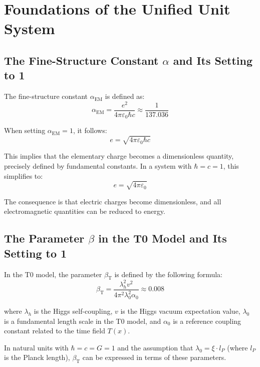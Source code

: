 \documentclass[12pt,a4paper]{article}
\newcommand{\Tfield}{T(x)}
\newcommand{\alphaEM}{\alpha_{\text{EM}}}
\newcommand{\betaT}{\beta_{\text{T}}}
\begin{document}
	\section{Foundations of the Unified Unit System}
	
	\subsection{The Fine-Structure Constant \(\alpha\) and Its Setting to 1}
	
	The fine-structure constant \(\alphaEM\) is defined as:
	\begin{equation}
		\alphaEM = \frac{e^2}{4\pi\varepsilon_0 \hbar c} \approx \frac{1}{137.036}
	\end{equation}
	
	When setting \(\alphaEM = 1\), it follows:
	\begin{equation}
		e = \sqrt{4\pi\varepsilon_0 \hbar c}
	\end{equation}
	
	This implies that the elementary charge becomes a dimensionless quantity, precisely defined by fundamental constants. In a system with \(\hbar = c = 1\), this simplifies to:
	\begin{equation}
		e = \sqrt{4\pi\varepsilon_0}
	\end{equation}
	
	The consequence is that electric charges become dimensionless, and all electromagnetic quantities can be reduced to energy.
	
	\subsection{The Parameter \(\beta\) in the T0 Model and Its Setting to 1}
	
	In the T0 model, the parameter \(\betaT\) is defined by the following formula:
	\begin{equation}
		\betaT = \frac{\lambda_h^2 v^2}{4\pi^2 \lambda_0^2 \alpha_0} \approx 0.008
	\end{equation}
	
	where \(\lambda_h\) is the Higgs self-coupling, \(v\) is the Higgs vacuum expectation value, \(\lambda_0\) is a fundamental length scale in the T0 model, and \(\alpha_0\) is a reference coupling constant related to the time field \(\Tfield\).
	
	In natural units with \(\hbar = c = G = 1\) and the assumption that \(\lambda_0 = \xi \cdot l_P\) (where \(l_P\) is the Planck length), \(\betaT\) can be expressed in terms of these parameters.
	
\end{document}
